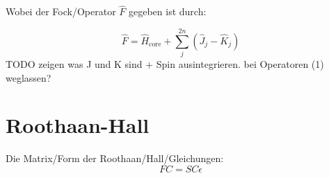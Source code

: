 Wobei der Fock\-/Operator $\hat{F}$ gegeben ist durch:

\begin{equation} \label{fockoperator}
  \hat{F} = \hat{H}_{\text{core}} + \sum_j^{2n} \left( \hat{J}_j - \hat{K}_j \right)
\end{equation}
TODO zeigen was J und K sind + Spin ausintegrieren. bei Operatoren (1) weglassen?

\section{Roothaan-Hall}
Die Matrix\-/Form der Roothaan\-/Hall\-/Gleichungen:
\begin{equation} \label{roothaan}
  FC = SC\epsilon
\end{equation}

\begin{comment}
Im Hartree-Fock-Ansatz wird aus dem Hamilton-Operator, der auf die gesamte Wellenfunktion wirkt, 
ein 1-Elektronen-Operator entwickelt, der Fock-Operator $\hat{F}$.
Da dieser Operator nur auf einzelne Elektronen wirkt, 
kann eine Pseudo-Eigenwerts-Gleichung für jedes Orbital erstellt werden.

Außerdem ist in diesem Ansatz die Elektron-Elektron-Abstoßung nur approximativ behandelt.
Dabei wird vereinfacht für die Repulsionen nur die Abstoßung die ein Elektron in einem gemittelten Potential
, das durch die anderen Elektronen entsteht, berechnet.
Für eine genauere Beschreibung müsste die Abstoßung aller Elektronen-Paare individuell berücksichtigt werden.
TODO Visualisierung.

\subsection{Fock Operator}
- Lösungsweg über das SCF-Verfahren (Matrix-Darstellung, ...)

- Verwendung von Basisfunktionen (Konstruktion der Wellenfunktion)

- Implementierung (größten Probleme: Integral-Evaluierung und
Matrix-Diagonalisierung)

\section{DFT}
- Herleitung (Nur die Idee/Ergebnisse, da wahrscheinlich über
meinem Niveau)

- Konkrete Umsetzung durch die Kohn-Sham-Gleichung (Terme in der
Schrödinger-Glg. + XC-Funktionale)

- Lösung durch FEM + PINVIT (+ LDA)

- Implemtierung über UG4 LUA

Über die Hartree\-/Fock\-/Methode folgen diese Gleichung für jedes Spinorbital:

\end{comment}